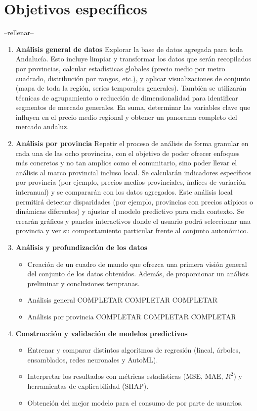 \documentclass[a4paper,11pt]{book}
\begin{document}
\section{Objetivos específicos}
--rellenar--
\begin{enumerate}
    \item \textbf{Análisis general de datos}
   Explorar la base de datos agregada para toda Andalucía. Esto incluye limpiar y transformar los datos que serán recopilados por provincias, calcular estadísticas globales (precio medio por metro cuadrado, distribución por rangos, etc.), y aplicar visualizaciones de conjunto (mapa de toda la región, series temporales generales). También se utilizarán técnicas de agrupamiento o reducción de dimensionalidad para identificar segmentos de mercado generales. En suma, determinar las variables clave que influyen en el precio medio regional y obtener un panorama completo del mercado andaluz.
    
    \item \textbf{Análisis por provincia}
    Repetir el proceso de análisis de forma granular en cada una de las ocho provincias, con el objetivo de poder ofrecer enfoques más concretos y no tan amplios como el comunitario, sino poder llevar el análisis al marco provincial incluso local. Se calcularán indicadores específicos por provincia (por ejemplo, precios medios provinciales, índices de variación interanual) y se compararán con los datos agregados. Este análisis local permitirá detectar disparidades (por ejemplo, provincias con precios atípicos o dinámicas diferentes) y ajustar el modelo predictivo para cada contexto. Se crearán gráficos y paneles interactivos donde el usuario podrá seleccionar una provincia y ver su comportamiento particular frente al conjunto autonómico.


    \item \textbf{Análisis y profundización de los datos}
    \begin{itemize}
        \item Creación de un cuadro de mando que ofrezca una primera visión general del conjunto de los datos obtenidos. Además, de proporcionar un análisis preliminar y conclusiones tempranas. 
        \item Análisis general COMPLETAR COMPLETAR COMPLETAR
        \item Análisis por provincia COMPLETAR COMPLETAR COMPLETAR
    \end{itemize}

    \item \textbf{Construcción y validación de modelos predictivos}
    \begin{itemize}
        \item Entrenar y comparar distintos algoritmos de regresión (lineal, árboles, ensamblados, redes neuronales y AutoML).
        \item Interpretar los resultados con métricas estadísticas (MSE, MAE, $R^2$) y herramientas de explicabilidad (SHAP).
        \item Obtención del mejor modelo para el consumo de por parte de usuarios.
    \end{itemize}


\end{enumerate}
\end{document}
